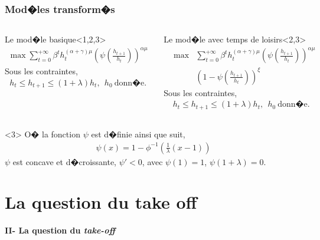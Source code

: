 \documentclass[10pt, hyperref={pdfpagemode=FullScreen}]{beamer} %
\begin{document}
\begin{frame}
\frametitle{Mod�les transform�s}
\begin{columns}
    \column{5.5cm}
\begin{block}{\scriptsize{Le mod�le basique}}<1,2,3>
\begin{eqnarray*}
\max \sum_{t=0}^{+\infty} \beta^{t} h_{t}^{(\alpha+\gamma)\mu}\left(\psi(\frac{h_{t+1}}{h_{t}})\right)^{\alpha\mu}
\end{eqnarray*}
Sous les contraintes, 
\begin{eqnarray*}
h_{t}\leq h_{t+1}\leq (1+\lambda)h_{t}, \ \ h_{0}\ \mbox{donn�e.}
\end{eqnarray*}
\end{block}

\column{5.5cm}
\begin{block}{\scriptsize{Le mod�le avec temps de loisirs}}<2,3>
\begin{eqnarray*}
&\max& \sum_{t=0}^{+\infty} \beta^{t} h_{t}^{(\alpha+\gamma)\mu}\left(\psi(\frac{h_{t+1}}{h_{t}})\right)^{\alpha\mu}\\
&&\left(1-\psi(\frac{h_{t+1}}{h_{t}})\right)^{\xi}
\end{eqnarray*}
Sous les contraintes, 
\begin{eqnarray*}
h_{t}\leq h_{t+1}\leq (1+\lambda)h_{t},\ \ h_{0}\ \mbox{donn�e.}
\end{eqnarray*}
\end{block}
\end{columns}

\begin{block}{}<3>
O� la fonction $\psi$ est d�finie ainsi que suit,
\begin{eqnarray*}
\psi(x) = 1-\phi^{-1}\left(\frac{1}{\lambda}(x-1)\right)
\end{eqnarray*}
$\psi$ est concave et d�croissante, $\psi'<0$, avec $\psi(1)=1$, $\psi(1+\lambda)=0$.
\end{block}


\end{frame}


\section{La question du take off}
  
\begin{frame}
\transdissolve
\begin{block}{}
\centering \huge{\textbf{II- La question du \emph{take-off}}}
\end{block}
\end{frame}
\end{document}
